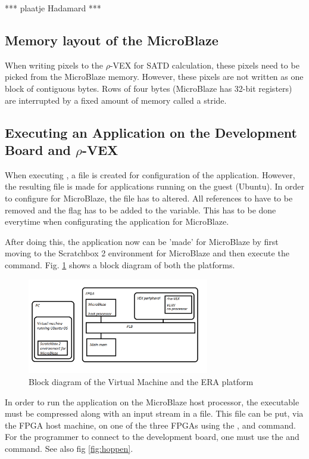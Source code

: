 *** plaatje Hadamard ***

\subsection{Memory layout of the MicroBlaze}
\label{sec:layout}
When writing pixels to the $\rho$-VEX for SATD calculation, these pixels need to be picked from the MicroBlaze memory. However, these pixels are not written as one block of contiguous bytes. Rows of four bytes (MicroBlaze has 32-bit registers) are interrupted by a fixed amount of memory called a stride.

\subsection{Executing an Application on the Development Board and $\rho$-VEX}
\label{sec:executing}
When executing , a file is created for configuration of the application. However, the resulting  file is made for applications running on the guest (Ubuntu). In order to configure for MicroBlaze, the  file has to altered. All references to  have to be removed and the  flag has to be added to the  variable. This has to be done everytime when configurating the application for MicroBlaze.

After doing this, the application now can be 'made' for MicroBlaze by first moving to the Scratchbox 2 environment for MicroBlaze and then execute the  command. Fig. \ref{fig:lelijk} shows a block diagram of both the platforms.

\begin{figure}[htb]%
\centering
\includegraphics[width=300px]{Pictures/Platform_paint}%
\caption{Block diagram of the Virtual Machine and the ERA platform}%
\label{fig:lelijk}%
\end{figure}

In order to run the application on the MicroBlaze host processor, the  executable must be compressed along with an input stream in a  file. This file can be put, via the FPGA host machine, on one of the three FPGAs using the ,  and  command. For the programmer to connect to the development board, one must use the  and  command. See also fig \ref{fig:hoppen}.

